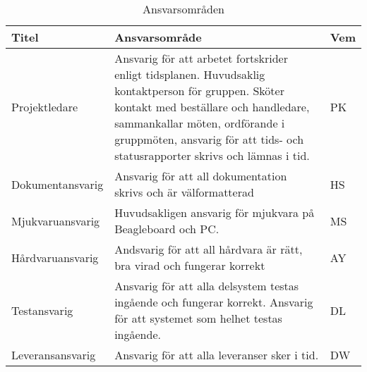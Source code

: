 \begin{table}[h]
  \centering
    \begin{tabularx}{\textwidth}{| l | X | l |}
      \hline
      \textbf{Titel} & \textbf{Ansvarsområde} & \textbf{Vem} \\
      \hline
      {Projektledare} & {Ansvarig för att arbetet fortskrider enligt tidsplanen. Huvudsaklig kontaktperson för gruppen. Sköter kontakt med beställare och handledare, sammankallar möten, ordförande i gruppmöten, ansvarig för att tids- och statusrapporter skrivs och lämnas i tid.} & {PK} \\\hline
      {Dokumentansvarig} & {Ansvarig för att all dokumentation skrivs och är välformatterad} & {HS} \\\hline
      {Mjukvaruansvarig} & {Huvudsakligen ansvarig för mjukvara på Beagleboard och PC.} & {MS} \\\hline
      {Hårdvaruansvarig} & {Andsvarig för att all hårdvara är rätt, bra virad och fungerar korrekt} & {AY} \\\hline
      {Testansvarig} & {Ansvarig för att alla delsystem testas ingående och fungerar korrekt. Ansvarig för att systemet som helhet testas ingående.} & {DL} \\\hline
      {Leveransansvarig} & {Ansvarig för att alla leveranser sker i tid.} & {DW} \\\hline
    \end{tabularx}
  \caption{Ansvarsområden} \label{projektplan:ansvarsomraden}
\end{table}
